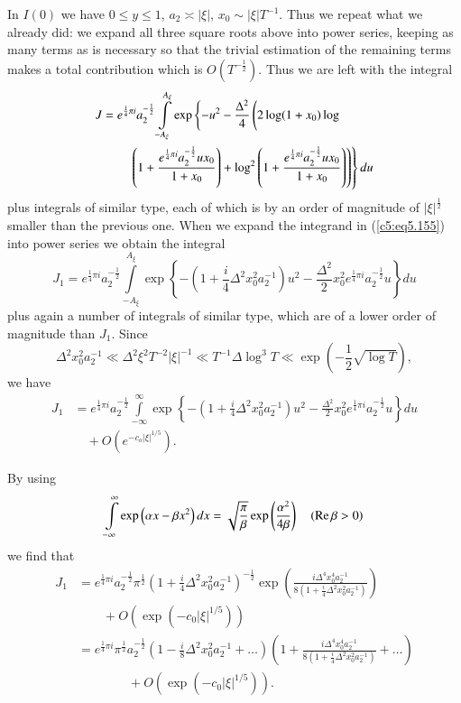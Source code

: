 In $I(0)$ we have $0 \leq y \leq 1$, $a_2 \asymp |\xi|$, $x_0 \sim
|\xi| T^{-1}$. Thus we repeat what we already did: we expand all three
square roots above into power series, keeping as many terms as is
necessary so that the trivial estimation of the remaining terms makes
a total contribution which is $O(T^{-\frac{1}{2}})$. Thus we are left
with the integral 
\begin{align}
J & = e^{\frac{1}{4} \pi i} a^{-\frac{1}{2}}_2
\int\limits^{A_\xi}_{-A_\xi} \exp \left\{ -u^2 - \frac{\Delta^2}{4} \left(2
\log (1+x_0) \log \phantom{\dfrac{1}{2}}\right.\right.\label{c5:eq5.155}\\  
& \qquad \left.\left. \left(1+\frac{e^{\frac{1}{4} \pi i} a^{-\frac{1}{2}}_2
  ux_0}{1+x_0}  \right) + \log^2 \left(1+ \frac{e^{\frac{1}{4} \pi i}
  a^{-\frac{1}{2}}_2 ux_0}{1+x_0} \right)\right)\right\} du\notag 
\end{align}
plus integrals of similar type, each of which is by an order of
magnitude of $|\xi|^{\frac{1}{2}}$ smaller than the previous one. When
we expand the integrand in (\ref{c5:eq5.155}) into power series we
obtain the integral 
{\fontsize{10pt}{12pt}\selectfont
\begin{equation}
J_1 = e^{\frac{1}{4} \pi i} a^{-\frac{1}{2}}_2
\int\limits^{A_\xi}_{-A_\xi} \exp \left\{- \left(1+\frac{i}{4}
\Delta^2 x^2_0 a^{-1}_2 \right) u^2 - \frac{\Delta^2}{2} x^2_0
e^{\frac{1}{4} \pi i} a^{-\frac{1}{2}}_2 u \right\}
du\label{c5:eq5.156} 
\end{equation}}
plus again a number of integrals of similar type, which are of a lower
order of magnitude than $J_1$. Since 
$$ 
\Delta^2 x^2_0 a^{-1}_2 \ll \Delta^2 \xi^2 T^{-2} |\xi|^{-1} \ll
T^{-1} \Delta \log^3 T \ll \exp \left(-\frac{1}{2} \sqrt{\log T}
\right), 
$$
we have 
\begin{align*}
J_1 &= e^{\frac{1}{4}\pi i} a^{-\frac{1}{2}}_2
\int\limits^\infty_{-\infty} \exp \left\{- \left(1+\frac{i}{4}
\Delta^2 x^2_0 a^{-1}_2 \right) u^2
-\frac{\Delta^2}{2} x^2_0
e^{\frac{1}{4} \pi i} a ^{-\frac{1}{2}}_2 u \right\} du\\
&\quad + O \left(e^{-c_o  |\xi|^{1/5}}\right). 
\end{align*}

By using 
$$
\int\limits^\infty_{-\infty} \exp \left(\alpha x - \beta x^2\right) dx =
\sqrt{\frac{\pi}{\beta}} \exp \left(\frac{\alpha^2}{4\beta} \right)
\quad (\operatorname{Re} \beta > 0) 
$$
we find that
\begin{align*}
J_1 & = e^{\frac{1}{4} \pi i} a^{-\frac{1}{2}}_2 \pi^{\frac{1}{2}}
\left(1+\frac{i}{4} \Delta^2 x^2_0 a^{-1}_2 \right)^{-\frac{1}{2}}
\exp \left(\frac{i\Delta^4 x^4_0 a^{-1}_2}{8\left(1+\frac{i}{4} \Delta^2
  x^2_0 a^{-1}_2\right)} \right) \\ 
& \qquad + O\left(\exp \left(-c_0 |\xi|^{1/5}\right)\right)\\
& = e^{\frac{1}{4} \pi i} \pi^{\frac{1}{2}} a^{-\frac{1}{2}}_2
\left(1-\frac{i}{8}\Delta^2 x^2_0 a^{-1}_2 + \ldots \right)
\left(1+\frac{i\Delta^{4} x^4_0 a^{-1}_2}{8\left(1+\frac{i}{4} \Delta^2
  x^2_0 a^{-1}_2\right)} + \ldots \right) \\ 
& \qquad \qquad + O \left(\exp \left(-c_0 |\xi|^{1/5}\right)\right).
\end{align*}

